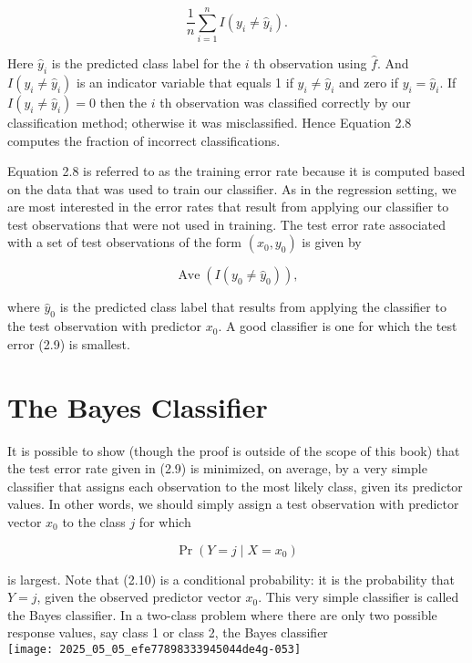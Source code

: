 \documentclass[10pt]{article}
\begin{document}
\begin{equation*}
\frac{1}{n} \sum_{i=1}^{n} I\left(y_{i} \neq \hat{y}_{i}\right) . \tag{2.8}
\end{equation*}


Here $\hat{y}_{i}$ is the predicted class label for the $i$ th observation using $\hat{f}$. And $I\left(y_{i} \neq \hat{y}_{i}\right)$ is an indicator variable that equals 1 if $y_{i} \neq \hat{y}_{i}$ and zero if $y_{i}=\hat{y}_{i}$. If $I\left(y_{i} \neq \hat{y}_{i}\right)=0$ then the $i$ th observation was classified correctly by our classification method; otherwise it was misclassified. Hence Equation 2.8 computes the fraction of incorrect classifications.

Equation 2.8 is referred to as the training error rate because it is computed based on the data that was used to train our classifier. As in the regression setting, we are most interested in the error rates that result from applying our classifier to test observations that were not used in training. The test error rate associated with a set of test observations of the form $\left(x_{0}, y_{0}\right)$ is given by


\begin{equation*}
\operatorname{Ave}\left(I\left(y_{0} \neq \hat{y}_{0}\right)\right), \tag{2.9}
\end{equation*}


where $\hat{y}_{0}$ is the predicted class label that results from applying the classifier to the test observation with predictor $x_{0}$. A good classifier is one for which the test error (2.9) is smallest.

\section*{The Bayes Classifier}
It is possible to show (though the proof is outside of the scope of this book) that the test error rate given in (2.9) is minimized, on average, by a very simple classifier that assigns each observation to the most likely class, given its predictor values. In other words, we should simply assign a test observation with predictor vector $x_{0}$ to the class $j$ for which


\begin{equation*}
\operatorname{Pr}\left(Y=j \mid X=x_{0}\right) \tag{2.10}
\end{equation*}


is largest. Note that (2.10) is a conditional probability: it is the probability that $Y=j$, given the observed predictor vector $x_{0}$. This very simple classifier is called the Bayes classifier. In a two-class problem where there are only two possible response values, say class 1 or class 2, the Bayes classifier\\
\texttt{[image: 2025\_05\_05\_efe77898333945044de4g-053]}
\end{document}
